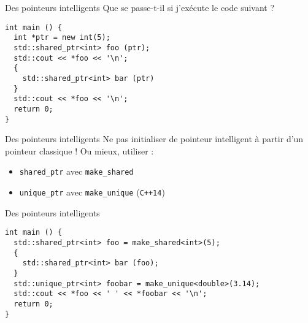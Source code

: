 \begin{frame}[fragile]{Des pointeurs intelligents}
  Que se passe-t-il si j'exécute le code suivant ?
  \begin{lstlisting}
int main () {
  int *ptr = new int(5);
  std::shared_ptr<int> foo (ptr);
  std::cout << *foo << '\n';
  {
    std::shared_ptr<int> bar (ptr)
  }
  std::cout << *foo << '\n';
  return 0;
}
  \end{lstlisting}
\end{frame}

\begin{frame}{Des pointeurs intelligents}
  Ne pas initialiser de pointeur intelligent à partir d'un pointeur classique !
  Ou mieux, utiliser :
  \begin{itemize}
  \item \texttt{shared\_ptr} avec \texttt{make\_shared}
  \item \texttt{unique\_ptr} avec \texttt{make\_unique} (\texttt{C++14})
  \end{itemize}
\end{frame}

\begin{frame}[fragile]{Des pointeurs intelligents}
  \begin{lstlisting}
int main () {
  std::shared_ptr<int> foo = make_shared<int>(5);
  {
    std::shared_ptr<int> bar (foo);
  }
  std::unique_ptr<int> foobar = make_unique<double>(3.14);
  std::cout << *foo << ' ' << *foobar << '\n';
  return 0;
}
  \end{lstlisting}
\end{frame}
